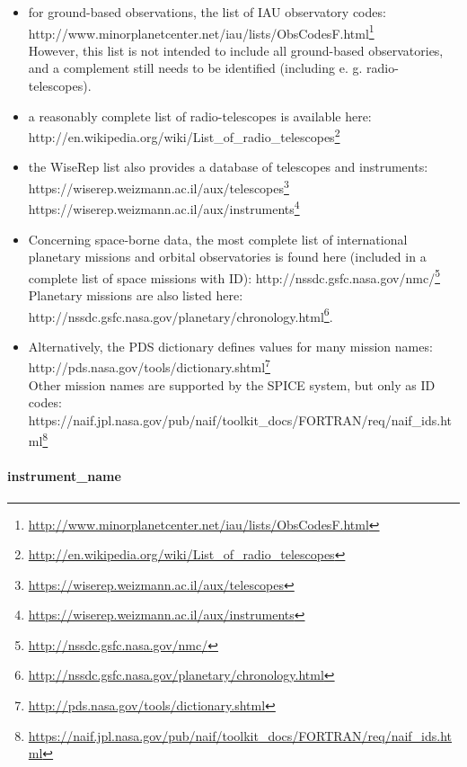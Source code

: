 \documentclass[11pt,a4paper]{ivoa}
\begin{document}
\begin{itemize}
\item for ground-based observations, the list of IAU observatory codes:\\http://www.minorplanetcenter.net/iau/lists/ObsCodesF.html\footnote{\url{http://www.minorplanetcenter.net/iau/lists/ObsCodesF.html}} \\However, this list is not intended to include all ground-based observatories, and a complement still needs to be identified (including e. g. radio-telescopes). 
\item a reasonably complete list of radio-telescopes is available here: \\http://en.wikipedia.org/wiki/List\_of\_radio\_telescopes\footnote{\url{http://en.wikipedia.org/wiki/List_of_radio_telescopes}}
\item the WiseRep list also provides a  database of telescopes and instruments: \\https://wiserep.weizmann.ac.il/aux/telescopes\footnote{\url{https://wiserep.weizmann.ac.il/aux/telescopes}} \\https://wiserep.weizmann.ac.il/aux/instruments\footnote{\url{https://wiserep.weizmann.ac.il/aux/instruments}}
\item Concerning space-borne data, the most complete list of international planetary missions and orbital observatories is found here (included in a complete list of space missions with ID): http://nssdc.gsfc.nasa.gov/nmc/\footnote{\url{http://nssdc.gsfc.nasa.gov/nmc/}}\\Planetary missions are also listed here: http://nssdc.gsfc.nasa.gov/planetary/chronology.html\footnote{\url{http://nssdc.gsfc.nasa.gov/planetary/chronology.html}}. 
\item Alternatively, the PDS dictionary defines values for many mission names: \\http://pds.nasa.gov/tools/dictionary.shtml\footnote{\url{http://pds.nasa.gov/tools/dictionary.shtml}}\\Other mission names are supported by the SPICE system, but only as ID codes: \\https://naif.jpl.nasa.gov/pub/naif/toolkit\_docs/FORTRAN/req/naif\_ids.html\footnote{\url{https://naif.jpl.nasa.gov/pub/naif/toolkit_docs/FORTRAN/req/naif_ids.html}}
\end{itemize}

\paragraph{instrument\_name}
\end{document}
